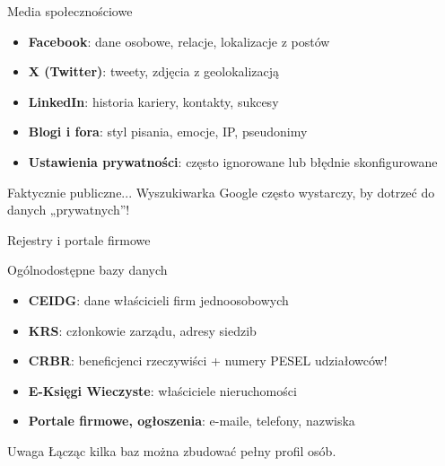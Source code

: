 \begin{frame}{Media społecznościowe}
\begin{block}{}
\begin{itemize}
  \item \textbf{Facebook}: dane osobowe, relacje, lokalizacje z postów
  \item \textbf{X (Twitter)}: tweety, zdjęcia z geolokalizacją
  \item \textbf{LinkedIn}: historia kariery, kontakty, sukcesy
  \item \textbf{Blogi i fora}: styl pisania, emocje, IP, pseudonimy
  \item \textbf{Ustawienia prywatności}: często ignorowane lub błędnie skonfigurowane \cite{zrodlo} \cite{zrodloArtykul}
\end{itemize}
\end{block}
\pause
\begin{exampleblock}{Faktycznie publiczne...}
Wyszukiwarka Google często wystarczy, by dotrzeć do danych „prywatnych”!
\end{exampleblock}
\end{frame}

\begin{frame}{Rejestry i portale firmowe}
\begin{block}{Ogólnodostępne bazy danych}
\begin{itemize}
  \item \textbf{CEIDG}: dane właścicieli firm jednoosobowych
  \item \textbf{KRS}: członkowie zarządu, adresy siedzib
  \item \textbf{CRBR}: beneficjenci rzeczywiści + numery PESEL udziałowców!
  \item \textbf{E-Księgi Wieczyste}: właściciele nieruchomości
  \item \textbf{Portale firmowe, ogłoszenia}: e-maile, telefony, nazwiska \cite{zrodloDzialalnosc}
\end{itemize}
\end{block}
\pause
\begin{alertblock}{Uwaga}
Łącząc kilka baz można zbudować pełny profil osób.
\end{alertblock}
\end{frame}

